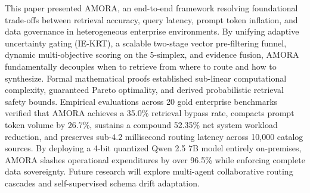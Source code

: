 \documentclass[conference,onecolumn,10pt]{IEEEtran}
\begin{document}
This paper presented AMORA, an end-to-end framework resolving foundational trade-offs between retrieval accuracy, query latency, prompt token inflation, and data governance in heterogeneous enterprise environments. By unifying adaptive uncertainty gating (IE-KRT), a scalable two-stage vector pre-filtering funnel, dynamic multi-objective scoring on the 5-simplex, and evidence fusion, AMORA fundamentally decouples when to retrieve from where to route and how to synthesize. Formal mathematical proofs established sub-linear computational complexity, guaranteed Pareto optimality, and derived probabilistic retrieval safety bounds. Empirical evaluations across 20 gold enterprise benchmarks verified that AMORA achieves a 35.0\% retrieval bypass rate, compacts prompt token volume by 26.7\%, sustains a compound 52.35\% net system workload reduction, and preserves sub-4.2 millisecond routing latency across 10,000 catalog sources. By deploying a 4-bit quantized Qwen 2.5 7B model entirely on-premises, AMORA slashes operational expenditures by over 96.5\% while enforcing complete data sovereignty. Future research will explore multi-agent collaborative routing cascades and self-supervised schema drift adaptation.
\end{document}
